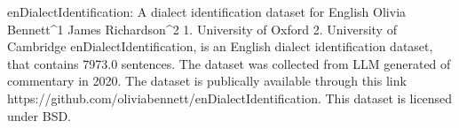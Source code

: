 
enDialectIdentification: A dialect identification dataset for English
Olivia Bennett^1 James Richardson^2
1. University of Oxford 2. University of Cambridge
enDialectIdentification, is an English dialect identification dataset, that contains 7973.0 sentences.
The dataset was collected from LLM generated of commentary in 2020. 
The dataset is publically available through this link https://github.com/oliviabennett/enDialectIdentification. This dataset is licensed under BSD.

